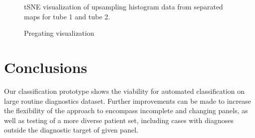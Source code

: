 \documentclass[11pt,a4paper]{article}
\begin{document}
\begin{figure}
   \centering
   \caption{tSNE visualization of upsampling histogram data from separated maps for tube 1 and tube 2.}
\end{figure}

\begin{figure}
   \caption{Pregating visualization}
\end{figure}

\section{Conclusions}

Our classification prototype shows the viability for automated classification on large routine diagnostics dataset.
Further improvements can be made to increase the flexibility of the approach to encompass incomplete and changing panels, as well as testing of a more diverse patient set, including cases with diagnoses outside the diagnostic target of given panel.





\end{document}
